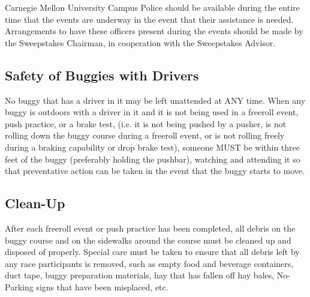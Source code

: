 	Carnegie Mellon University Campus Police should be available during the entire
	time that the events are underway in the event that their assistance is needed.
	Arrangements to have these officers present during the events should be made by
	the Sweepstakes Chairman, in cooperation with the Sweepstakes Advisor.
	
	
\subsection{Safety of Buggies with Drivers}
\label{ssec:SafetyBuggyDriver}
	No buggy that has a driver in it may be left unattended at ANY time. When any
	buggy is outdoors with a driver in it and it is not being used in a freeroll
	event, push practice, or a brake test, (i.e. it is not being pushed by a pusher, 
	is not rolling down the buggy course during a freeroll event, or is 
	not rolling freely during a braking capability or drop brake test), someone MUST 
	be within three feet of the buggy (preferably holding the pushbar), watching and
	attending it so that preventative action can be taken in the event that the
	buggy starts to move.
	
	
\subsection{Clean-Up}
\label{ssec:CleanUp}
	After each freeroll event or push practice has been completed, all debris 
	on the buggy course and on the sidewalks around the course must be cleaned up 
	and disposed of properly. Special care must be taken to ensure that all debris 
	left by any race participants is removed, such as empty food and beverage
	containers, duct tape, buggy preparation materials, hay that has fallen off hay
	bales, No-Parking signs that have been misplaced, etc.

